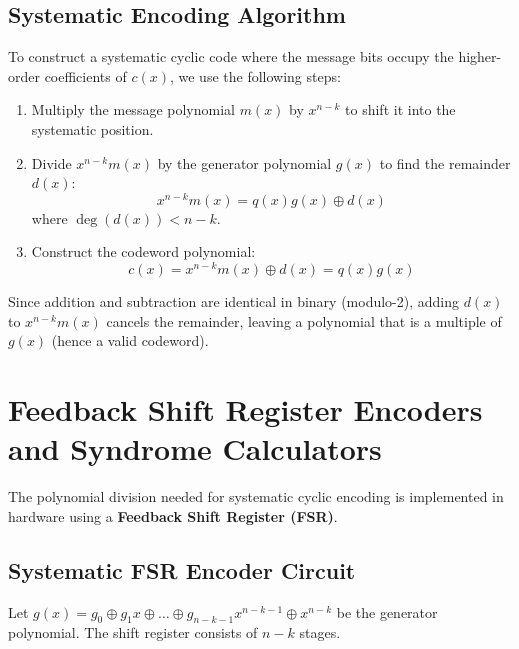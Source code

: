 \documentclass[12pt,a4paper]{article}
\begin{document}
\subsection{Systematic Encoding Algorithm}
To construct a systematic cyclic code where the message bits occupy the higher-order coefficients of $c(x)$, we use the following steps:
\begin{tcolorbox}[formulabox, title={\textbf{Systematic Cyclic Encoding Steps}}]
\begin{enumerate}[label=\textbf{Step \arabic*:}, leftmargin=2.0cm, itemsep=2pt]
  \item Multiply the message polynomial $m(x)$ by $x^{n-k}$ to shift it into the systematic position.
  \item Divide $x^{n-k}m(x)$ by the generator polynomial $g(x)$ to find the remainder $d(x)$:
    \[ x^{n-k}m(x) = q(x)g(x) \oplus d(x) \]
    where $\deg(d(x)) < n-k$.
  \item Construct the codeword polynomial:
    \[ c(x) = x^{n-k}m(x) \oplus d(x) = q(x)g(x) \]
\end{enumerate}
\end{tcolorbox}

Since addition and subtraction are identical in binary (modulo-2), adding $d(x)$ to $x^{n-k}m(x)$ cancels the remainder, leaving a polynomial that is a multiple of $g(x)$ (hence a valid codeword).

\section{Feedback Shift Register Encoders and Syndrome Calculators}

The polynomial division needed for systematic cyclic encoding is implemented in hardware using a \textbf{Feedback Shift Register (FSR)}.

\subsection{Systematic FSR Encoder Circuit}
Let $g(x) = g_0 \oplus g_1 x \oplus \dots \oplus g_{n-k-1} x^{n-k-1} \oplus x^{n-k}$ be the generator polynomial. The shift register consists of $n-k$ stages.
\end{document}

